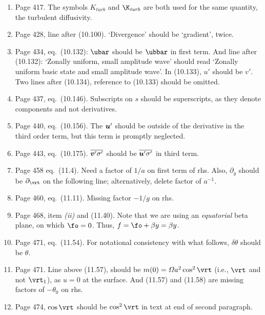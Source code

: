 \documentclass[10pt]{article}
\newcommand{\eq}{eq.\ } \newcommand{\Eq}{Eq.\ }
\begin{document}
\begin{enumerate}
\item Page 417. The symbols $K_{\textit{turb}}$ and $\K_{\textit{turb}}$ are both used for the same quantity, the turbulent diffusivity.

\item Page 428, line after (10.100). `Divergence' should be `gradient', twice.

\item Page 434, \eq (10.132): $\ubar$ should be $\ubbar$ in first term. And line after (10.132): `Zonally uniform, small amplitude wave' should read `Zonally uniform basic state and small amplitude wave'. In (10.133), $u'$ should be $v'$. Two lines after (10.134), reference to (10.133) should be omitted.

\item Page 437, \eq (10.146). Subscripts on $s$ should be superscripts, as they denote components and not derivatives.

\item Page 440, \eq (10.156). The ${\bm {u}}'$ should be outside of the derivative in the third order term, but this term is promptly neglected.

\item Page 443, \eq (10.175). $\overline{{\bm {v}}' \sigma'}^{}$ should be $\overline{{\bm {u}}' \sigma'}^{}$ in third term.

\item Page 458 \eq (11.4). Need a factor of $1/a$ on first term of rhs. Also, $\partial_y$ should be $\partial_\vrt$ on the following line; alternatively, delete factor of $a^{-1}$.

\item Page 460, \eq (11.11). Missing factor $-1/g$ on rhs.

\item Page 468, item \textit{(ii)} and (11.40). Note that we are using an \textit{equatorial} beta plane, on which $\fo=0$. Thus, $f=\fo + \beta y = \beta y$.

\item Page  471, \eq (11.54). For notational consistency with what follows, $\delta \theta$ should be $\theta$.

\item Page 471. Line above (11.57), should be $m(0) = \Omega a^2 \cos^2 \vrt$ (i.e., $\vrt$ and not $\vrt_1$), as $u=0$ at the surface. And (11.57) and (11.58) are missing factors of $-\theta_0$ on rhs.

\item Page 474, $\cos \vrt$ should be $\cos^2 \vrt$ in text at end of second paragraph.


\end{enumerate}
\end{document}
